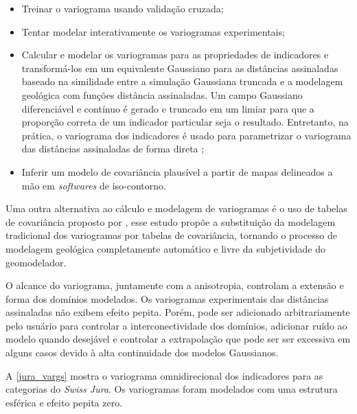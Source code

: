 \begin{itemize}
    \item Treinar o variograma usando validação cruzada;
    \item Tentar modelar interativamente os variogramas experimentais;
    \item Calcular e modelar os variogramas para as propriedades de indicadores e transformá-los em um equivalente Gaussiano para as distâncias assinaladas baseado na similidade entre a simulação Gaussiana truncada e a modelagem geológica com funções distância assinaladas. Um campo Gaussiano diferenciável e contínuo é gerado e truncado em um limiar para que a proporção correta de um indicador particular seja o resultado. Entretanto, na prática, o variograma dos indicadores é usado para parametrizar o variograma das distâncias assinaladas de forma direta \cite{martin2017implicitmodeling};
    \item Inferir um modelo de covariância plausível a partir de mapas delineados a mão em \textit{softwares} de iso-contorno.
\end{itemize}

Uma outra alternativa ao cálculo e modelagem de variogramas é o uso de tabelas de covariância proposto por , esse estudo propõe a substituição da modelagem tradicional dos variogramas por tabelas de covariância, tornando o processo de modelagem geológica completamente automático e livre da subjetividade do geomodelador.

O alcance do variograma, juntamente com a anisotropia, controlam a extensão e forma dos domínios modelados. Os variogramas experimentais das distâncias assinaladas não exibem efeito pepita. Porém, pode ser adicionado arbitrariamente pelo usuário para controlar a interconectividade dos domínios, adicionar ruído ao modelo quando desejável e controlar a extrapolação que pode ser ser excessiva em alguns casos devido à alta continuidade dos modelos Gaussianos.

A \autoref{jura_vargs} mostra o variograma omnidirecional dos indicadores para as categorias do \textit{Swiss Jura}. Os variogramas foram modelados com uma estrutura esférica e efeito pepita zero.

